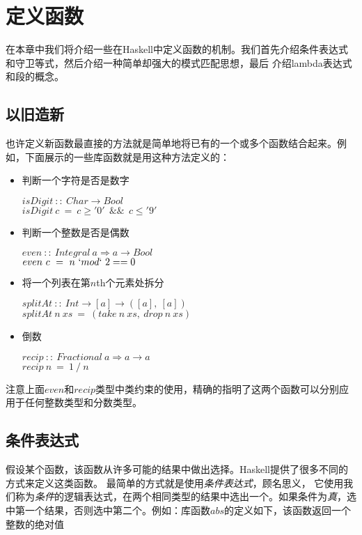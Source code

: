 \chapter{定义函数}
在本章中我们将介绍一些在Haskell中定义函数的机制。我们首先介绍条件表达式和守卫等式，然后介绍一种简单却强大的模式匹配思想，最后
介绍lambda表达式和段的概念。

\section{以旧造新}
也许定义新函数最直接的方法就是简单地将已有的一个或多个函数结合起来。例如，下面展示的一些库函数就是用这种方法定义的：

\begin{itemize}
\item 判断一个字符是否是数字

\hspace*{1cm} $isDigit~::~Char \rightarrow Bool$\\
\hspace*{1cm} $isDigit~c~=~c \geq '0'~~\&\&~~c \leq '9'$

\item 判断一个整数是否是偶数

\hspace*{1cm} $even~::~Integral~a \Rightarrow a \rightarrow Bool$\\
\hspace*{1cm} $even~c~=~n~`mod`~2 == 0$

\item 将一个列表在第$n$th个元素处拆分

\hspace*{1cm} $splitAt~::~Int \rightarrow [a] \rightarrow ([a],~[a])$\\
\hspace*{1cm} $splitAt~n~xs~=~(take~n~xs,~drop~n~xs)$

\item 倒数

\hspace*{1cm} $recip~::~Fractional~a \Rightarrow a \rightarrow a$\\
\hspace*{1cm} $recip~n~=~1~/~n$

\end{itemize}

注意上面$even$和$recip$类型中类约束的使用，精确的指明了这两个函数可以分别应用于任何整数类型和分数类型。

\section{条件表达式}
假设某个函数，该函数从许多可能的结果中做出选择。Haskell提供了很多不同的方式来定义这类函数。 最简单的方式就是使用\textit{条件表达式}，顾名思义， 它使用我们称为\textit{条件}的逻辑表达式，在两个相同类型的结果中选出一个。如果条件为{\it{真}}，选中第一个结果，否则选中第二个。例如：库函数$abs$的定义如下，该函数返回一个整数的绝对值

